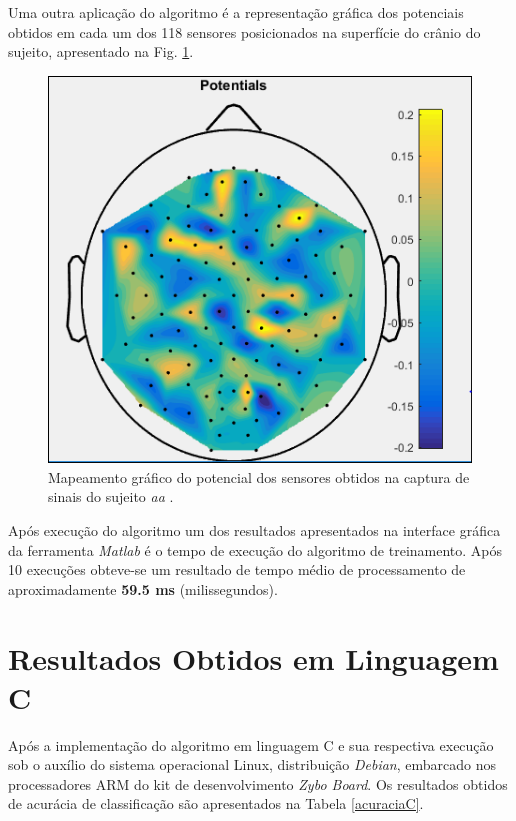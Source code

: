 Uma outra aplicação do algoritmo é a representação gráfica dos potenciais obtidos em cada um dos 118 sensores posicionados na superfície do crânio do sujeito, apresentado na Fig. \ref{resultadoLotte}.
\newpage
\begin{figure}[h]
	\centering
	\includegraphics[keepaspectratio=true,scale=0.45]{figuras/image_csp_matlab.PNG}
	\caption{Mapeamento gráfico do potencial dos sensores obtidos na captura de sinais do sujeito \textit{aa} \cite{F.Lotte}.}
	\label{resultadoLotte}
\end{figure}

Após execução do algoritmo um dos resultados apresentados na interface gráfica da ferramenta \textit{Matlab} é o tempo de execução do algoritmo de treinamento. Após 10 execuções obteve-se um resultado de tempo médio de processamento de aproximadamente \textbf{59.5 ms} (milissegundos).

\section{Resultados Obtidos em Linguagem C}
Após a implementação do algoritmo em linguagem C e sua respectiva execução sob o auxílio do sistema operacional Linux, distribuição \textit{Debian}, embarcado nos processadores ARM do kit de desenvolvimento \textit{Zybo Board}. Os resultados obtidos de acurácia de classificação são apresentados na Tabela \ref{acuraciaC}.

